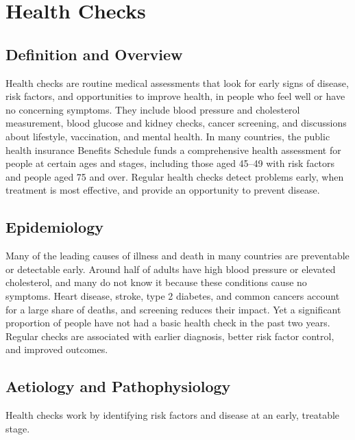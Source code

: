 \chapter{Health Checks}

\section*{Definition and Overview}
Health checks are routine medical assessments that look for early signs of disease, risk factors, and opportunities to improve health, in people who feel well or have no concerning symptoms. They include blood pressure and cholesterol measurement, blood glucose and kidney checks, cancer screening, and discussions about lifestyle, vaccination, and mental health. In many countries, the public health insurance Benefits Schedule funds a comprehensive health assessment for people at certain ages and stages, including those aged 45--49 with risk factors and people aged 75 and over. Regular health checks detect problems early, when treatment is most effective, and provide an opportunity to prevent disease.

\section*{Epidemiology}
Many of the leading causes of illness and death in many countries are preventable or detectable early. Around half of adults have high blood pressure or elevated cholesterol, and many do not know it because these conditions cause no symptoms. Heart disease, stroke, type 2 diabetes, and common cancers account for a large share of deaths, and screening reduces their impact. Yet a significant proportion of people have not had a basic health check in the past two years. Regular checks are associated with earlier diagnosis, better risk factor control, and improved outcomes.

\section*{Aetiology and Pathophysiology}
Health checks work by identifying risk factors and disease at an early, treatable stage.

